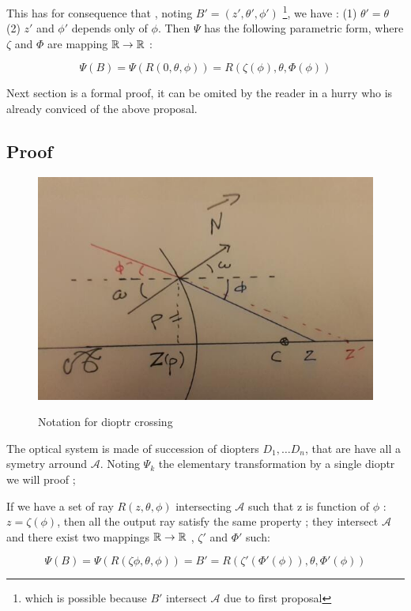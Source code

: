This has for consequence that , noting  $B'=(z',\theta',\phi')$ \footnote{which is possible because $B'$ intersect  $\mathcal{A}$ due to first proposal},
we have : (1) $\theta'=\theta$  (2)  $z'$ and $\phi'$ depends only of $\phi$. 
Then $\Psi $ has the following parametric form, where $\zeta$ and $\Phi$ are mapping $\mathbb{R} \rightarrow \mathbb{R}$ :

\begin{equation}
	\Psi(B) = \Psi(R(0,\theta,\phi)) = R(\zeta(\phi) ,\theta,\Phi(\phi))
\end{equation}

Next section is a formal proof,  it can be omited by the reader in a hurry who is already conviced of the above proposal.



\subsection{Proof}

\begin{figure}
\centering
	\includegraphics[width=12cm]{Methods/Images/Radial-PhiOmegaZ.jpg} \\
	\caption{Notation for dioptr crossing}
	\label{fig:RadPhiOmegZ}
\end{figure}

The optical system is made of succession of diopters $D_1,\dots D_n$,
that are have all a symetry arround $\mathcal{A}$.  Noting $\Psi_k$
the elementary transformation by a single dioptr  we will  proof ;

\begin{proposal}  \;
If  we have a set of ray $R(z,\theta,\phi)$ intersecting  $\mathcal{A}$ such that  z is function of $\phi$ :
$z=\zeta(\phi)$, then  all the output ray satisfy the same property ; they intersect $\mathcal{A}$ and there exist 
two mappings  $\mathbb{R} \rightarrow \mathbb{R}$ , $\zeta'$ and $\Phi'$  such:

\begin{equation}
	\Psi(B) = \Psi(R(\zeta{\phi},\theta,\phi)) =  B' = R(\zeta'(\Phi'(\phi)),\theta,\Phi'(\phi))
\end{equation}
\end{proposal}

